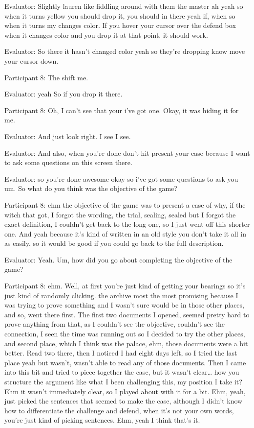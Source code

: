 \documentclass{l4proj}
\begin{document}
\begin{appendices}
Evaluator: Slightly lauren like fiddling around with them the master ah yeah so when it turns yellow you should drop it, you should in there yeah if, when so when it turns my changes color. If you hover your cursor over the defend box when it changes color and you drop it at that point, it should work.

Evaluator: So there it hasn't changed color yeah so they're dropping know move your cursor down.

Participant 8: The shift me.

Evaluator: yeah So if you drop it there.

Participant 8: Oh, I can't see that your i've got one. Okay, it was hiding it for me.

Evaluator: And just look right. I see I see.

Evaluator: And also, when you're done don't hit present your case because I want to ask some questions on this screen there.

Evaluator: so you're done awesome okay so i've got some questions to ask you um. So what do you think was the objective of the game?

Participant 8: ehm the objective of the game was to present a case of why, if the witch that got, I forgot the wording, the trial, sealing, sealed but I forgot the exact definition, I couldn’t get back to the long one, so I just went off this shorter one. And yeah because it's kind of written in an old style you don’t take it all in as easily, so it would be good if you could go back to the full description. 

Evaluator: Yeah. Um, how did you go about completing the objective of the game?

Participant 8: ehm. Well, at first you're just kind of getting your bearings so it’s just kind of randomly clicking.  the archive most the most promising because I was trying to prove something and I wasn't sure would be in those other places, and so, went there first. The first two documents I opened, seemed pretty hard to prove anything from that, as I couldn’t see the objective, couldn’t see the connection, I seen the time was running out so I decided to try the other places, and second place, which I think was the palace, ehm, those documents were  a bit better. Read two there, then I noticed I had eight days left, so I tried the last place yeah but wasn't, wasn't able to read any of those documents. Then I came into this bit and tried to piece together the case, but it wasn't clear… how you structure the argument like what I been challenging this, my position I take it? Ehm it wasn’t immediately clear, so I played about with it for a bit. Ehm, yeah, just picked the sentences that seemed to make the case, although I didn’t know how to differentiate the challenge and defend, when it’s not your own words, you’re just kind of picking sentences. Ehm, yeah I think that’s it.


\end{appendices}
\end{document}
